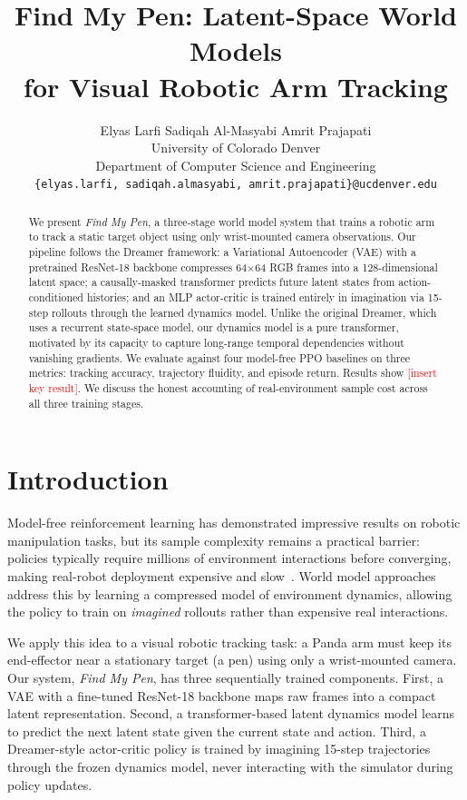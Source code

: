 \documentclass{article}
\title{Find My Pen: Latent-Space World Models\\for Visual Robotic Arm Tracking}
\author{
  Elyas Larfi \quad Sadiqah Al-Masyabi \quad Amrit Prajapati \\
  University of Colorado Denver \\
  Department of Computer Science and Engineering \\
  \texttt{\{elyas.larfi, sadiqah.almasyabi, amrit.prajapati\}@ucdenver.edu}
}
\newcommand{\TODO}[1]{\textcolor{red}{[#1]}}
\begin{document}
\maketitle

\begin{abstract}
We present \emph{Find My Pen}, a three-stage world model system that trains a robotic
arm to track a static target object using only wrist-mounted camera observations.
Our pipeline follows the Dreamer framework: a Variational Autoencoder (VAE) with a
pretrained ResNet-18 backbone compresses 64$\times$64 RGB frames into a 128-dimensional
latent space; a causally-masked transformer predicts future latent states from
action-conditioned histories; and an MLP actor-critic is trained entirely in
imagination via 15-step rollouts through the learned dynamics model.
Unlike the original Dreamer, which uses a recurrent state-space model, our dynamics
model is a pure transformer, motivated by its capacity to capture long-range temporal
dependencies without vanishing gradients.
We evaluate against four model-free PPO baselines on three metrics: tracking accuracy,
trajectory fluidity, and episode return.
Results show \TODO{insert key result}.
We discuss the honest accounting of real-environment sample cost across all three
training stages.
\end{abstract}


\section{Introduction}

Model-free reinforcement learning has demonstrated impressive results on robotic
manipulation tasks, but its sample complexity remains a practical barrier:
policies typically require millions of environment interactions before converging,
making real-robot deployment expensive and slow~\cite{openai2019dexterous}.
World model approaches~\cite{ha2018worldmodels,hafner2019dreamer} address this by
learning a compressed model of environment dynamics, allowing the policy to train
on \emph{imagined} rollouts rather than expensive real interactions.

We apply this idea to a visual robotic tracking task: a Panda arm must keep its
end-effector near a stationary target (a pen) using only a wrist-mounted camera.
Our system, \emph{Find My Pen}, has three sequentially trained components.
First, a VAE with a fine-tuned ResNet-18 backbone maps raw frames into a compact
latent representation.
Second, a transformer-based latent dynamics model learns to predict the next latent
state given the current state and action.
Third, a Dreamer-style actor-critic policy is trained by imagining 15-step trajectories
through the frozen dynamics model, never interacting with the simulator during policy
updates.
\end{document}
